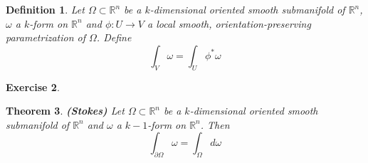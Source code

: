 \documentclass[12pt]{amsart}
\newtheorem{thm}{Theorem}[subsection]
\newtheorem{defn}[thm]{Definition}
\newtheorem{ex}[thm]{Exercise}
\newcommand{\om}{\omega}
\newcommand{\Om}{\Omega}
\newcommand{\R}{\mathbb{R}}
\begin{document}
	\begin{defn}
		Let $\Om \subset \R^n$ be a $k$-dimensional oriented smooth submanifold of $\R^n$, $\om$ a $k$-form on $\R^n$ and $\phi: U \rightarrow V$ a local smooth, orientation-preserving parametrization of $\Om$. Define $$\int_V \om = \int_U \phi^*\om $$
	\end{defn} 

	\begin{ex}
		
	\end{ex}

	\begin{thm}{\textbf{(Stokes)}}
		Let $\Om \subset \R^n$ be a $k$-dimensional oriented smooth submanifold of $\R^n$ and $\om$ a $k-1$-form on $\R^n$. Then $$\int_{\partial \Om} \om = \int_\Om d \om$$
	\end{thm}
\end{document}
